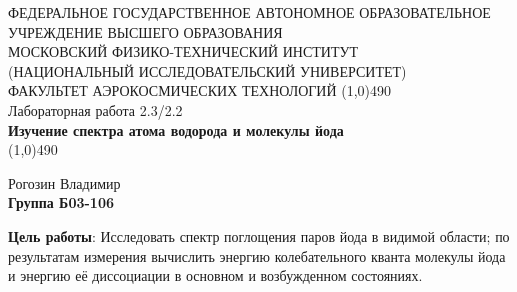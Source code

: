 \documentclass[a4paper,12pt]{article}
\begin{document}
\begin{titlepage}
\begin{center}
\large{\small ФЕДЕРАЛЬНОЕ ГОСУДАРСТВЕННОЕ АВТОНОМНОЕ ОБРАЗОВАТЕЛЬНОЕ\\ УЧРЕЖДЕНИЕ ВЫСШЕГО ОБРАЗОВАНИЯ \\ МОСКОВСКИЙ ФИЗИКО-ТЕХНИЧЕСКИЙ ИНСТИТУТ\\ (НАЦИОНАЛЬНЫЙ ИССЛЕДОВАТЕЛЬСКИЙ УНИВЕРСИТЕТ)\\ ФАКУЛЬТЕТ АЭРОКОСМИЧЕСКИХ ТЕХНОЛОГИЙ}
\vfill
\line(1,0){490}\\[1mm]
\huge{Лабораторная работа 2.3/2.2}\\
\huge\textbf{Изучение спектра атома водорода и молекулы йода}\\
\line(1,0){490}\\[1mm]
\vfill
\begin{flushright}
\normalsize{Рогозин Владимир}\\
\normalsize{\textbf{Группа Б03-106}}\\
\end{flushright}
\end{center}
\end{titlepage}

\textbf{Цель работы}:
Исследовать спектр поглощения паров йода в видимой области; по результатам измерения вычислить энергию колебательного кванта молекулы йода и энергию её диссоциации в основном и возбужденном состояниях.


\end{document}
